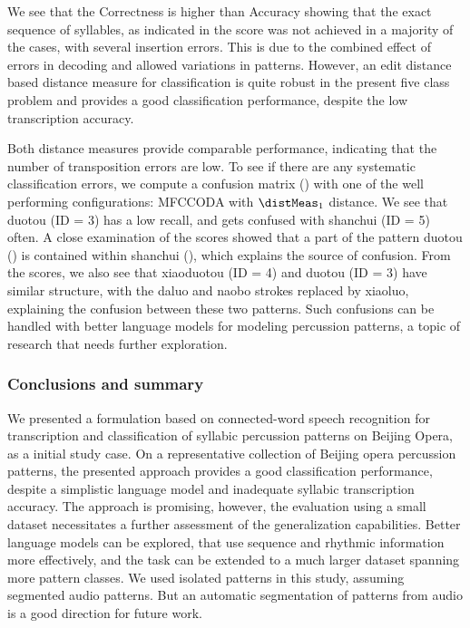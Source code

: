 We see that the Correctness is higher than Accuracy showing that the exact sequence of syllables, as indicated in the score was not achieved in a majority of the cases, with several insertion errors. This is due to the combined effect of errors in decoding and allowed variations in patterns. However, an edit distance based distance measure for classification is quite robust in the present five class problem and provides a good classification performance, despite the low transcription accuracy. 

Both distance measures provide comparable performance, indicating that the number of transposition errors are low. To see if there are any systematic classification errors, we compute a confusion matrix () with one of the well performing configurations: \acrshort{MFCCODA} with $\distMeas_1$ distance. We see that \gls{duotou} (ID = 3) has a low recall, and gets confused with \gls{shanchui} (ID = 5) often. A close examination of the scores showed that a part of the pattern duotou () is contained within shanchui (), which explains the source of confusion. From the scores, we also see that \gls{xiaoduotou} (ID = 4) and \gls{duotou} (ID = 3) have similar structure, with the \gls{daluo} and \gls{naobo} strokes replaced by \gls{xiaoluo}, explaining the confusion between these two patterns. Such confusions can be handled with better language models for modeling percussion patterns, a topic of research that needs further exploration.
\subsubsection{Conclusions and summary}
We presented a formulation based on connected-word speech recognition for transcription and classification of syllabic percussion patterns on Beijing Opera, as a initial study case. On a representative collection of Beijing opera percussion patterns, the presented approach provides a good classification performance, despite a simplistic language model and inadequate syllabic transcription accuracy. The approach is promising, however, the evaluation using a small dataset necessitates a further assessment of the generalization capabilities. Better language models can be explored, that use sequence and rhythmic information more effectively, and the task can be extended to a much larger dataset spanning more pattern classes. We used isolated patterns in this study, assuming segmented audio patterns. But an automatic segmentation of patterns from audio is a good direction for future work. 

